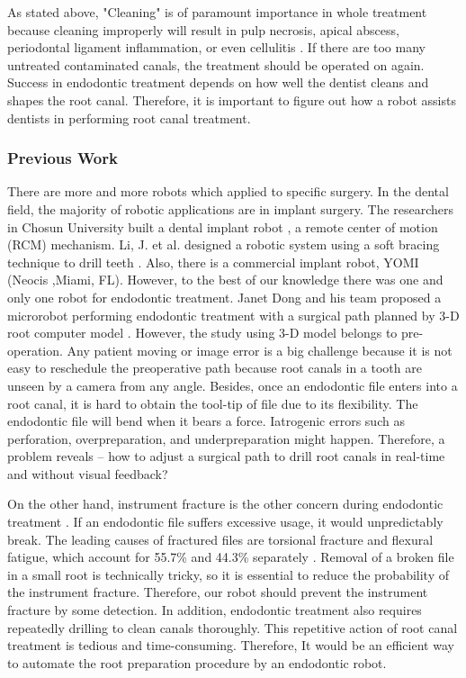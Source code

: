\par
As stated above, "Cleaning" is of paramount importance in whole treatment because cleaning improperly will result in pulp necrosis, apical abscess, periodontal ligament inflammation, or even cellulitis \cite{GUTMANN2011209}. If there are too many untreated contaminated canals, the treatment should be operated on again. Success in endodontic treatment depends on how well the dentist cleans and shapes the root canal. Therefore, it is important to figure out how a robot assists dentists in performing root canal treatment.
\subsubsection{Previous Work}
\hspace*{6mm}There are more and more robots which applied to specific surgery. In the dental field, the majority of robotic applications are in implant surgery. The researchers in Chosun University built a dental implant robot \cite{Kim2009ASO}, a remote center of motion (RCM) mechanism. Li, J. et al. designed a robotic system using a soft bracing technique to drill teeth \cite{Li2019ACD}. Also, there is a commercial implant robot, YOMI (Neocis ,Miami, FL). However, to the best of our knowledge there was one and only one robot for endodontic treatment. Janet Dong and his team proposed a microrobot performing endodontic treatment with a surgical path planned by 3-D root computer model \cite{dong2006wip}. However, the study using 3-D model belongs to pre-operation. Any patient moving or image error is a big challenge because it is not easy to reschedule the preoperative path because  root canals in a tooth are unseen by a camera from any angle. Besides, once an endodontic file enters into a root canal, it is hard to obtain the tool-tip of file due to its flexibility. The endodontic file will bend when it bears a force. Iatrogenic errors such as perforation, overpreparation, and underpreparation might happen. Therefore, a problem reveals -- how to adjust a surgical path to drill root canals in real-time and without visual feedback?
\par
On the other hand, instrument fracture is the other concern during endodontic treatment \cite{GUTMANN201197}. If an endodontic file suffers excessive usage, it would unpredictably break. The leading causes of fractured files are torsional fracture and flexural fatigue, which account for 55.7\% and 44.3\% separately \cite{SATTAPAN2000161}. Removal of a broken file in a small root is technically tricky, so it is essential to reduce the probability of the instrument fracture. Therefore, our robot should prevent the instrument fracture by some detection. In addition, endodontic treatment also requires repeatedly drilling to clean canals thoroughly. This repetitive action of root canal treatment is tedious and time-consuming. Therefore, It would be an efficient way to automate the root preparation procedure by an endodontic robot.
